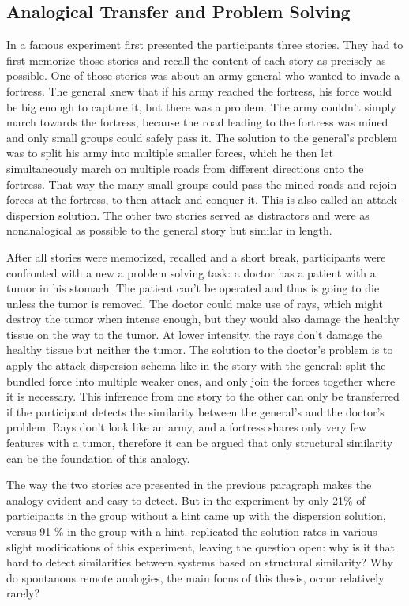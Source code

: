 \documentclass[a4paper,man,natbib,floatsintext,import]{apa6}
\begin{document}
\subsection{Analogical Transfer and Problem Solving}
In a famous experiment \cite{Gick1980} first presented the participants three stories. They had to first memorize those stories and recall the content of each story as precisely as possible. One of those stories was about an army general who wanted to invade a fortress. The general knew that if his army reached the fortress, his force would be big enough to capture it, but there was a problem. The army couldn't simply march towards the fortress, because the road leading to the fortress was mined and only small groups could safely pass it. The solution to the general's problem was to split his army into multiple smaller forces, which he then let simultaneously march on multiple roads from different directions onto the fortress. That way the many small groups could pass the mined roads and rejoin forces at the fortress, to then attack and conquer it. This is also called an attack-dispersion solution. The other two stories served as distractors and were as nonanalogical as possible to the general story but similar in length.

After all stories were memorized, recalled and a short break, participants were confronted with a new a problem solving task: a doctor has a patient with a tumor in his stomach. The patient can't be operated and thus is going to die unless the tumor is removed. The doctor could make use of rays, which might destroy the tumor when intense enough, but they would also damage the healthy tissue on the way to the tumor. At lower intensity, the rays don't damage the healthy tissue but neither the tumor. The solution to the doctor's problem is to apply the attack-dispersion schema like in the story with the general: split the bundled force into multiple weaker ones, and only join the forces together where it is necessary. This inference from one story to the other can only be transferred if the participant detects the similarity between the general's and the doctor's problem. Rays don't look like an army, and a fortress shares only very few features with a tumor, therefore it can be argued that only structural similarity can be the foundation of this analogy.

The way the two stories are presented in the previous paragraph makes the analogy evident and easy to detect. But in the experiment by \cite{Gick1980} only 21\% of participants in the group without a hint came up with the dispersion solution, versus 91 \% in the group with a hint. \cite{Gick1983} replicated the solution rates in various slight modifications of this experiment, leaving the question open: why is it that hard to detect similarities between systems based on structural similarity? Why do spontanous remote analogies, the main focus of this thesis, occur relatively rarely?
\end{document}
